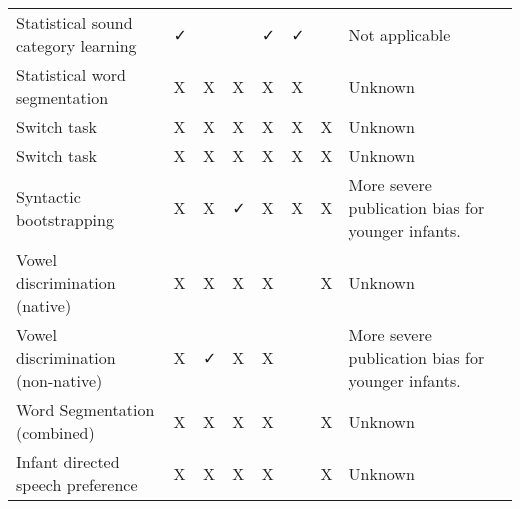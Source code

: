 \documentclass[
]{article}
\begin{document}
\begin{tabular}{llllllll}
Statistical sound category learning & ✓ &  &  & ✓ & ✓ &  & Not applicable\\
Statistical word segmentation & X & X & X & X & X &  & Unknown\\
Switch task & X & X & X & X & X & X & Unknown\\
\addlinespace
Switch task & X & X & X & X & X & X & Unknown\\
Syntactic bootstrapping & X & X & ✓ & X & X & X & More severe publication bias for younger infants.\\
Vowel discrimination (native) & X & X & X & X &  & X & Unknown\\
Vowel discrimination (non-native) & X & ✓ & X & X &  &  & More severe publication bias for younger infants.\\
Word Segmentation (combined) & X & X & X & X &  & X & Unknown\\
\addlinespace
Infant directed speech preference & X & X & X & X &  & X & Unknown\\
\bottomrule
\end{tabular}
\endgroup{}
\end{document}
